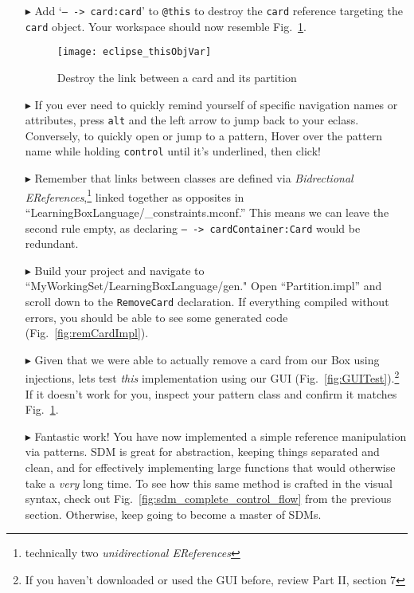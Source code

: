 \begin{itemize}
\item[$\blacktriangleright$] Add `\texttt{-- -> card:card}' to \texttt{@this} to destroy the \texttt{card} reference targeting the \texttt{card} object. Your
workspace should now resemble Fig.~\ref{fig:deleteReference}.

\begin{figure}[htp]
\begin{center}
  \texttt{[image: eclipse\_thisObjVar]}
  \caption{Destroy the link between a card and its partition}
  \label{fig:deleteReference}
\end{center}
\end{figure}

\item[$\blacktriangleright$] If you ever need to quickly remind yourself of specific navigation names or attributes, press \texttt{alt} and the left arrow to
jump back to your eclass. Conversely, to quickly open or jump to a pattern, Hover over the pattern name while holding \texttt{control} until it's underlined, then click!

\item[$\blacktriangleright$] Remember that links between classes are defined via \emph{Bidrectional EReferences},\footnote{technically two
\emph{unidirectional EReferences}} linked together as opposites in ``LearningBoxLanguage/\_con\-straints.mconf.'' This means we can leave the second rule empty,
as declaring \texttt{-- -> cardContainer:Card} would be redundant.

\item[$\blacktriangleright$] Build your project and navigate to ``MyWorkingSet/LearningBoxLanguage/gen." Open ``Partition.impl'' and scroll down to the
\texttt{RemoveCard} declaration. If everything compiled without errors, you should be able to see some generated code (Fig.~\ref{fig:remCardImpl}).

\item[$\blacktriangleright$] Given that we were able to actually remove a card from our Box using injections, lets test \emph{this} implementation using our GUI
(Fig.~\ref{fig:GUITest}).\footnote{ If you haven't downloaded or used the GUI before, review Part II, section 7} If it doesn't work for you, inspect your
pattern class and confirm it matches Fig.~\ref{fig:deleteReference}.

\item[$\blacktriangleright$] Fantastic work! You have now implemented a simple reference manipulation via patterns. SDM is great for
abstraction, keeping things separated and clean, and for effectively implementing large functions that would otherwise take a \emph{very} long time. To see how
this same method is crafted in the visual syntax, check out Fig.~\ref{fig:sdm_complete_control_flow} from the previous section. Otherwise, keep going to become
a master of SDMs.


\end{itemize}
